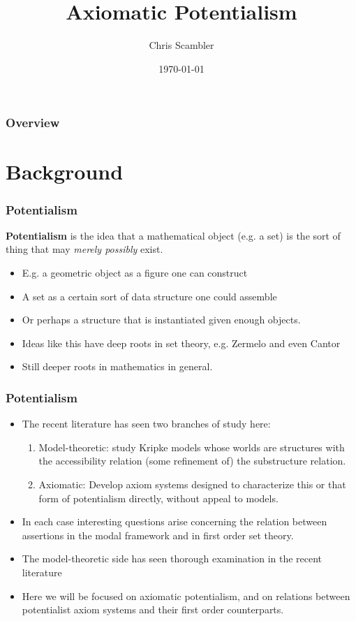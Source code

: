 \documentclass{beamer}
\title[Axiomatic Potentialism]{Axiomatic Potentialism}
\author{Chris Scambler}
\institute[ASC] 
{
All Souls College, \\
Oxford University \\ 
\medskip
\textit{chris.scambler@all-souls.ox.ac.uk} 
}
\date{\today}
\begin{document}
\begin{frame}
\titlepage 
\end{frame}

\begin{frame}
\frametitle{Overview} 
\tableofcontents 
\end{frame}
\section{Background}

\begin{frame}
\frametitle{Potentialism}
\begin{block}
    {\bf Potentialism} is the idea that a mathematical object (e.g. a set) is the sort 
    of thing that may \emph{merely possibly} exist.
\end{block}
\begin{itemize}
    \item<3-> E.g. a geometric object as a figure one can construct
    \item<4-> A set as a certain sort of data structure one could assemble
    \item<5-> Or perhaps a structure that is instantiated given enough objects.
    \item<6-> Ideas like this have deep roots in set theory, e.g. Zermelo and even Cantor
    \item<7-> Still deeper roots in mathematics in general.
\end{itemize}
\end{frame}

\begin{frame}
\frametitle{Potentialism}
    \begin{itemize}
        \item The recent literature has seen two branches of study here:
        \begin{enumerate}
            \item<2->   Model-theoretic: study Kripke models whose worlds are 
                        structures with the accessibility relation (some refinement of)
                        the substructure relation.
            \item<3->   Axiomatic: Develop axiom systems designed to characterize 
                        this or that form of potentialism directly, without appeal to models.
        \end{enumerate}
        \item<4->   In each case interesting questions arise concerning the relation 
                    between assertions in the modal framework and in first order set theory.
        \item<5->   The model-theoretic side has seen thorough examination in the recent literature
        \item<6->   Here we will be focused on axiomatic potentialism, and on 
                    relations between potentialist axiom systems and their first order counterparts.
    \end{itemize}
    
\end{frame}
\end{document}
